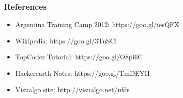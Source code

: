 \documentclass{beamer}
\begin{document}
\begin{frame}
\frametitle{ References }
\begin{itemize}
		\item Argentina Training Camp 2012: https://goo.gl/iesQFX
	\item Wikipedia: https://goo.gl/3TuSCl
	\item TopCoder Tutorial: https://goo.gl/O8pi6C
	\item Hackerearth Notes: https://goo.gl/TmDEYH
	\item Visualgo site: http://visualgo.net/ufds
\end{itemize}
\end{frame}
\end{document}
